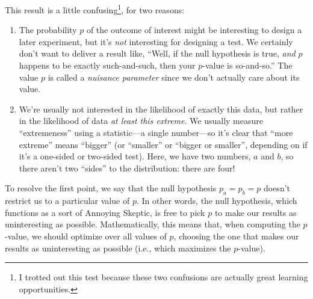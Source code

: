 \documentclass{book}
\providecommand{\tightlist}{%
  \setlength{\itemsep}{0pt}\setlength{\parskip}{0pt}}
\begin{document}
This result is a little confusing\footnote{I trotted out this test
  because these two confusions are actually great learning
  opportunities.}, for two reasons:

\begin{enumerate}
\def\labelenumi{\arabic{enumi}.}
\tightlist
\item
  The probability \(p\) of the outcome of interest might be interesting
  to design a later experiment, but it's \emph{not} interesting for
  designing a test. We certainly don't want to deliver a result like,
  ``Well, if the null hypothesis is true, \emph{and} \(p\) happens to be
  exactly such-and-such, then your \(p\)-value is so-and-so.'' The value
  \(p\) is called a \emph{nuisance parameter} since we don't actually
  care about its value.
\item
  We're usually not interested in the likelihood of exactly this data,
  but rather in the likelihood of data \emph{at least this extreme}. We
  usually measure ``extremeness'' using a statistic---a single
  number---so it's clear that ``more extreme'' means ``bigger'' (or
  ``smaller'' or ``bigger or smaller'', depending on if it's a one-sided
  or two-sided test). Here, we have two numbers, \(a\) and \(b\), so
  there aren't two ``sides'' to the distribution: there are four!
\end{enumerate}

To resolve the first point, we say that the null hypothesis
\(p_a = p_b = p\) doesn't restrict us to a particular value of \(p\). In
other words, the null hypothesis, which functions as a sort of Annoying
Skeptic, is free to pick \(p\) to make our results as uninteresting as
possible. Mathematically, this means that, when computing the
\(p\)-value, we should optimize over all values of \(p\), choosing the
one that makes our results as uninteresting as possible (i.e., which
maximizes the \(p\)-value).
\end{document}
